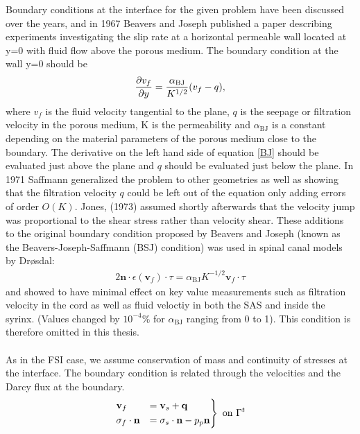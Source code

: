 Boundary conditions at the interface for the given problem have been discussed over the years, and in 1967 Beavers and Joseph \cite{Beav67} published a paper describing experiments investigating the slip rate at a horizontal permeable wall located at y=0 with fluid flow above the porous medium. The boundary condition at the wall y=0 should be
\begin{align}
\frac{\partial v_f}{\partial y} = \frac{\alpha_{\text{BJ}}}{K^{1/2}}(v_f-q), \label{BJ}
\end{align}
where $v_f$ is the fluid velocity tangential to the plane, $q$ is the seepage or filtration velocity in the porous medium, K is the permeability and $\alpha_{\text{BJ}}$ is a constant depending on the material parameters of the porous medium close to the boundary. The derivative on the left hand side of equation \eqref{BJ} should be evaluated just above the plane and $q$ should be evaluated just below the plane. 
In 1971 Saffmann \cite{Saff71} generalized the problem to other geometries as well as showing that the filtration velocity $q$ could be left out of the equation only adding errors of order $O(K)$. Jones, (1973) \cite{Jone73} assumed shortly afterwards that the velocity jump was proportional to the shear stress rather than velocity shear. These additions to the original boundary condition proposed by Beavers and Joseph (known as the Beavers-Joseph-Saffmann (BSJ) condition) was used in spinal canal models by Dr{\o}sdal:
\begin{align}
2\mathbf{n} \cdot \epsilon(\mathbf{v}_f) \cdot \tau = \alpha_{\text{BJ}}K^{-1/2}\mathbf{v}_f\cdot \tau \label{BJS}
\end{align}
and showed to have minimal effect on key value measurements such as filtration velocity in the cord as well as fluid veloctiy in both the SAS and inside the syrinx. (Values changed by $10^{-4} \%$ for $\alpha_{\text{BJ}}$ ranging from 0 to 1). This condition is therefore omitted in this thesis. 
\\
\\
As in the FSI case, we assume conservation of mass and continuity of stresses at the interface. The boundary condition is related through the velocities and the Darcy flux at the boundary. 
\begin{align}
\begin{rcases}
\mathbf{v}_f & = \mathbf{v}_s + \mathbf{q} \\
\sigma_f \cdot \mathbf{n} & =  \sigma_s \cdot \mathbf{n} - p_p\mathbf{n}
\end{rcases} 
\text{ on } \Gamma^t \label{Biotbnd}
\end{align}
